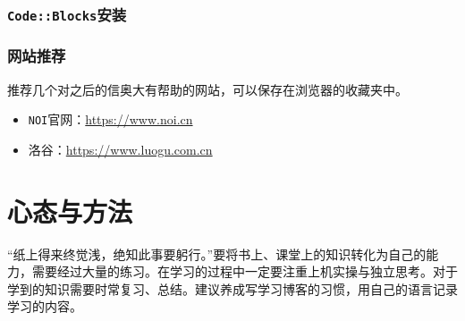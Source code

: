 \subsubsection{\texttt{Code::Blocks}安装}

\subsubsection{网站推荐}
推荐几个对之后的信奥大有帮助的网站，可以保存在浏览器的收藏夹中。
\begin{itemize}
\item \texttt{NOI}官网：\href{https://www.noi.cn}{https://www.noi.cn}
\item 洛谷：\href{https://www.luogu.com.cn}{https://www.luogu.com.cn}
\end{itemize}

\section{心态与方法}
“纸上得来终觉浅，绝知此事要躬行。”要将书上、课堂上的知识转化为自己的能力，需要经过大量的练习。在学习的过程中一定要注重上机实操与独立思考。对于学到的知识需要时常复习、总结。建议养成写学习博客的习惯，用自己的语言记录学习的内容。


